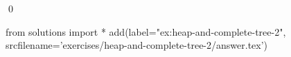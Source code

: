 
\begin{ex} 
  \label{ex:heap-and-complete-tree-2}
  
  \qed
\end{ex} 
\begin{python0}
from solutions import *
add(label="ex:heap-and-complete-tree-2",
    srcfilename='exercises/heap-and-complete-tree-2/answer.tex') 
\end{python0}
